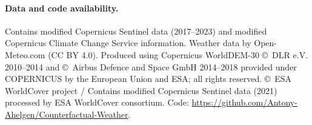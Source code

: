 \documentclass[10pt]{article}
\begin{document}
\paragraph{Data and code availability.} Contains modified Copernicus Sentinel data (2017--2023) and modified
Copernicus Climate Change Service information. Weather data by Open-Meteo.com (CC BY 4.0). Produced using Copernicus
WorldDEM-30 \copyright\ DLR e.V. 2010--2014 and \copyright\ Airbus Defence and Space GmbH 2014--2018 provided under
COPERNICUS by the European Union and ESA; all rights reserved. \copyright\ ESA WorldCover project / Contains modified
Copernicus Sentinel data (2021) processed by ESA WorldCover consortium. Code: \url{https://github.com/Antony-Ahelgen/Counterfactual-Weather}.



\end{document}
